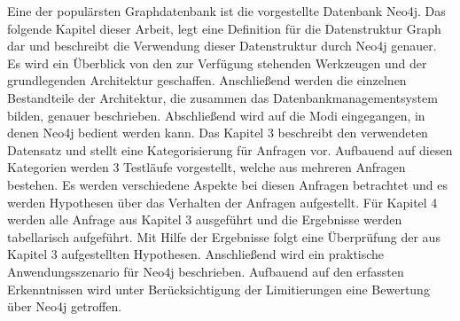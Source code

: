 Eine der populärsten Graphdatenbank ist die vorgestellte Datenbank Neo4j\parencite{francis2018cypher}.  \newline 
Das folgende Kapitel dieser Arbeit, legt eine Definition für die Datenstruktur Graph dar und beschreibt die
Verwendung dieser Datenstruktur durch Neo4j genauer. Es wird
ein Überblick von den zur Verfügung stehenden Werkzeugen und der grundlegenden Architektur geschaffen. Anschließend werden die einzelnen Bestandteile der Architektur, die zusammen das Datenbankmanagementsystem bilden, genauer beschrieben. Abschließend wird auf die Modi eingegangen, in denen Neo4j bedient werden
kann. \newline
Das Kapitel 3 beschreibt den verwendeten Datensatz und stellt eine Kategorisierung
für Anfragen vor. Aufbauend auf diesen Kategorien werden 3 Testläufe vorgestellt, welche aus mehreren Anfragen bestehen. Es werden verschiedene Aspekte
bei diesen Anfragen betrachtet und es werden Hypothesen über das Verhalten der
Anfragen aufgestellt. \newline
Für Kapitel 4 werden alle Anfrage aus Kapitel 3 ausgeführt und die Ergebnisse werden tabellarisch aufgeführt. Mit Hilfe der Ergebnisse folgt eine Überprüfung der
aus Kapitel 3 aufgestellten Hypothesen. Anschließend wird ein praktische Anwendungsszenario für Neo4j beschrieben. Aufbauend auf den erfassten Erkenntnissen
wird unter Berücksichtigung der Limitierungen eine Bewertung über Neo4j getroffen.

